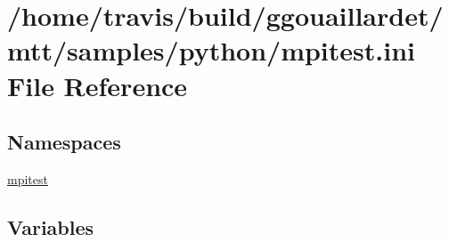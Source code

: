 \hypertarget{mpitest_8ini}{\section{/home/travis/build/ggouaillardet/mtt/samples/python/mpitest.ini File Reference}
\label{mpitest_8ini}
}
\subsection*{Namespaces}
\begin{DoxyCompactItemize}
\item 
\hyperlink{namespacempitest}{mpitest}
\end{DoxyCompactItemize}
\subsection*{Variables}
